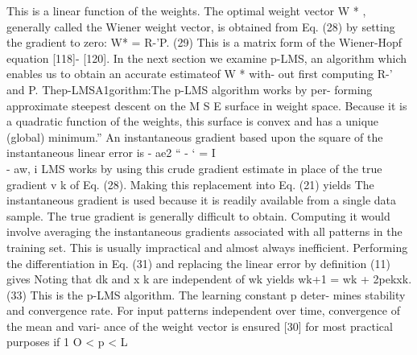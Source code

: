 This is a linear function of the weights. The optimal weight vector W *
, generally called the Wiener weight vector, is obtained from Eq. (28)
by setting the gradient to zero: W* = R-'P. (29) This is a matrix form
of the Wiener-Hopf equation {[}118{]}- {[}120{]}. In the next section we
examine p-LMS, an algorithm which enables us to obtain an accurate
estimateof W * with- out first computing R-' and P.
Thep-LMSA1gorithm:The p-LMS algorithm works by per- forming approximate
steepest descent on the M S E surface in weight space. Because it is a
quadratic function of the weights, this surface is convex and has a
unique (global) minimum.'' An instantaneous gradient based upon the
square of the instantaneous linear error is - ae2 `` - ` = I\\
- aw, i LMS works by using this crude gradient estimate in place of the
true gradient v k of Eq. (28). Making this replacement into Eq. (21)
yields The instantaneous gradient is used because it is readily
available from a single data sample. The true gradient is generally
difficult to obtain. Computing it would involve averaging the
instantaneous gradients associated with all patterns in the training
set. This is usually impractical and almost always inefficient.
Performing the differentiation in Eq. (31) and replacing the linear
error by definition (11) gives Noting that dk and x k are independent of
wk yields wk+1 = wk + 2pekxk. (33) This is the p-LMS algorithm. The
learning constant p deter- mines stability and convergence rate. For
input patterns independent over time, convergence of the mean and vari-
ance of the weight vector is ensured {[}30{]} for most practical
purposes if 1 O \textless{} p \textless{} L

